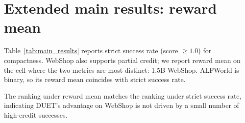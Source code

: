 
\section{Extended main results: reward mean}
\label{app:reward_table}

Table~\ref{tab:main_results} reports strict success rate (score $\geq 1.0$) for compactness. WebShop also supports partial credit; we report reward mean on the cell where the two metrics are most distinct: 1.5B-WebShop. ALFWorld is binary, so its reward mean coincides with strict success rate.



The ranking under reward mean matches the ranking under strict success rate, indicating DUET's advantage on WebShop is not driven by a small number of high-credit successes.
